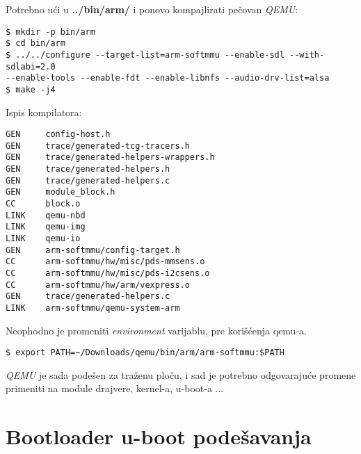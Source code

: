 \documentclass{article}
\begin{document}
Potrebno ući u \textbf{../bin/arm/} i ponovo kompajlirati pečovan \textit{QEMU}: %
\begin{commandline}
  \begin{verbatim}
$ mkdir -p bin/arm
$ cd bin/arm
$ ../../configure --target-list=arm-softmmu --enable-sdl --with-sdlabi=2.0 
--enable-tools --enable-fdt --enable-libnfs --audio-drv-list=alsa
$ make -j4
  \end{verbatim}
\end{commandline}

 

Ispis kompilatora: \\

\begin{commandline}
  \begin{verbatim}
GEN     config-host.h
GEN     trace/generated-tcg-tracers.h
GEN     trace/generated-helpers-wrappers.h
GEN     trace/generated-helpers.h
GEN     trace/generated-helpers.c
GEN     module_block.h
CC      block.o
LINK    qemu-nbd
LINK    qemu-img
LINK    qemu-io
GEN     arm-softmmu/config-target.h
CC      arm-softmmu/hw/misc/pds-mmsens.o
CC      arm-softmmu/hw/misc/pds-i2csens.o
CC      arm-softmmu/hw/arm/vexpress.o
GEN     trace/generated-helpers.c
LINK    arm-softmmu/qemu-system-arm
  \end{verbatim}
\end{commandline}

Neophodno je promeniti \textit{environment} varijablu, pre korišćenja qemu-a.

\begin{commandline}
  \begin{verbatim}
$ export PATH=~/Downloads/qemu/bin/arm/arm-softmmu:$PATH
  \end{verbatim}
\end{commandline}

\textit{QEMU} je sada podešen za traženu ploču, i sad je potrebno odgovarajuće promene primeniti na module drajvere, kernel-a, u-boot-a ...

\section{Bootloader u-boot podešavanja} 
\end{document}
